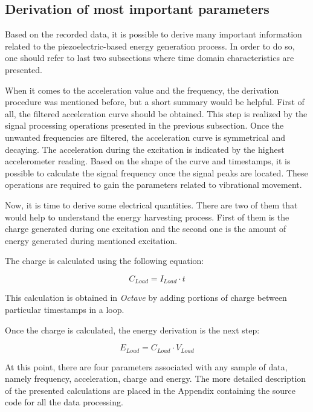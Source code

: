 \documentclass[12pt,a4paper]{article}
\begin{document}
\subsection{Derivation of most important parameters}
Based on the recorded data, it is possible to derive many important information related to the piezoelectric-based energy generation process. In order to do so, one should refer to last two subsections where time domain characteristics are presented.
\par
When it comes to the acceleration value and the frequency, the derivation procedure was mentioned before, but a short summary would be helpful. First of all, the filtered acceleration curve should be obtained. This step is realized by the signal processing operations presented in the previous subsection. Once the unwanted frequencies are filtered, the acceleration curve is symmetrical and decaying. The acceleration during the excitation is indicated by the highest accelerometer reading. Based on the shape of the curve and timestamps, it is possible to calculate the signal frequency once the signal peaks are located. These operations are required to gain the parameters related to vibrational movement.
\par
Now, it is time to derive some electrical quantities. There are two of them that would help to understand the energy harvesting process. First of them is the charge generated during one excitation and the second one is the amount of energy generated during mentioned excitation.
\par
The charge is calculated using the following equation:

\begin{equation}
	C_{Load} = I_{Load} \cdot t
	\label{eqn:charge}
\end{equation}

This calculation is obtained in \textit{Octave} by adding portions of charge between particular timestamps in a loop.
\par
Once the charge is calculated, the energy derivation is the next step:

\begin{equation}
	E_{Load} = C_{Load} \cdot V_{Load}
	\label{eqn:energy}
\end{equation}
\par
At this point, there are four parameters associated with any sample of data, namely frequency, acceleration, charge and energy. The more detailed description of the presented calculations are placed in the Appendix containing the source code for all the data processing. 
\end{document}
